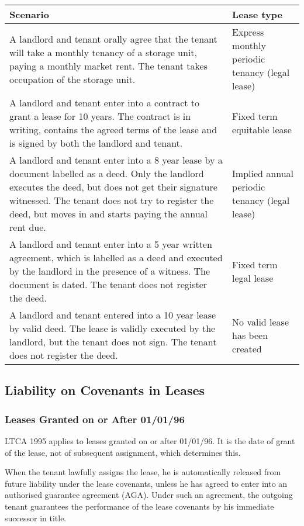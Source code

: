 \documentclass[
]{article}
\begin{document}
\begin{longtable}[]{@{}ll@{}}
\toprule()
Scenario & Lease type \\
\midrule()
\endhead
A landlord and tenant orally agree that the tenant will take a monthly
tenancy of a storage unit, paying a monthly market rent. The tenant
takes occupation of the storage unit. & Express monthly periodic tenancy
(legal lease) \\
A landlord and tenant enter into a contract to grant a lease for 10
years. The contract is in writing, contains the agreed terms of the
lease and is signed by both the landlord and tenant. & Fixed term
equitable lease \\
A landlord and tenant enter into a 8 year lease by a document labelled
as a deed. Only the landlord executes the deed, but does not get their
signature witnessed. The tenant does not try to register the deed, but
moves in and starts paying the annual rent due. & Implied annual
periodic tenancy (legal lease) \\
A landlord and tenant enter into a 5 year written agreement, which is
labelled as a deed and executed by the landlord in the presence of a
witness. The document is dated. The tenant does not register the deed. &
Fixed term legal lease \\
A landlord and tenant entered into a 10 year lease by valid deed. The
lease is validly executed by the landlord, but the tenant does not sign.
The tenant does not register the deed. & No valid lease has been
created \\
\bottomrule()
\end{longtable}

\hypertarget{liability-on-covenants-in-leases}{%
\subsection{Liability on Covenants in
Leases}\label{liability-on-covenants-in-leases}}

\hypertarget{leases-granted-on-or-after-010196}{%
\subsubsection{Leases Granted on or After
01/01/96}\label{leases-granted-on-or-after-010196}}

LTCA 1995 applies to leases granted on or after 01/01/96. It is the date
of grant of the lease, not of subsequent assignment, which determines
this.

When the tenant lawfully assigns the lease, he is automatically released
from future liability under the lease covenants, unless he has agreed to
enter into an authorised guarantee agreement (AGA). Under such an
agreement, the outgoing tenant guarantees the performance of the lease
covenants by his immediate successor in title.
\end{document}
